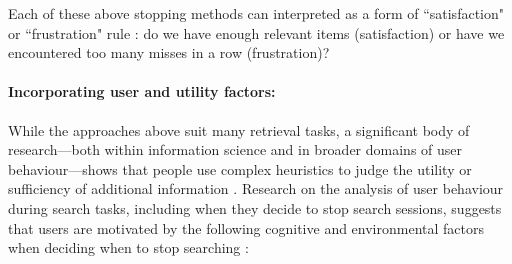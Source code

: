 \documentclass[10pt,oneside]{book}
\begin{document}
Each of these above stopping methods can interpreted as a form of ``satisfaction" or ``frustration" rule \cite{ilani_analysis_2024, cooper_selecting_1973}: do we have enough relevant items (satisfaction) or have we encountered too many misses in a row (frustration)?

\paragraph{Incorporating user and utility factors:}
While the approaches above suit many retrieval tasks, a significant body of research—both within information science and in broader domains of user behaviour—shows that people use complex heuristics to judge the utility or sufficiency of additional information \cite{nickles_judgment-based_1995, browne_stopping_2005, ilani_analysis_2024}. Research on the analysis of user behaviour during search tasks, including when they decide to stop search sessions, suggests that users are motivated by the following cognitive and environmental factors when deciding when to stop searching \cite{ilani_analysis_2024}:
\end{document}
